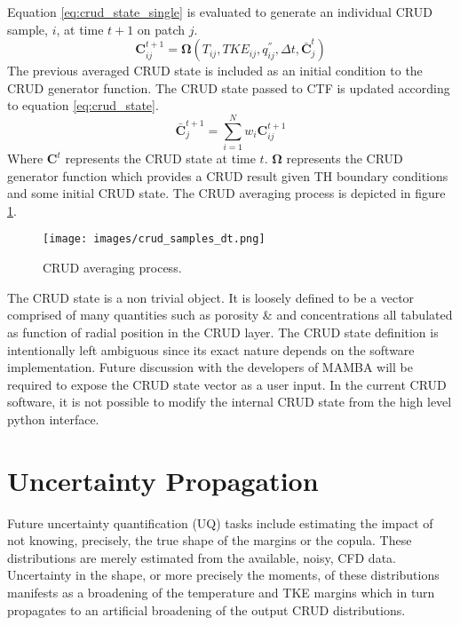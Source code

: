 Equation \ref{eq:crud_state_single} is evaluated to generate an individual CRUD sample, $i$, at time $t+1$ on patch $j$.
\begin{equation}
\mathrm{\mathbf{C}}_{ij}^{t+1} = \mathbf{\Omega}(T_{ij}, TKE_{ij}, q_{ij}^{''}, \Delta t, \mathbf{\bar C}_j^t)
\label{eq:crud_state_single}
\end{equation}
The previous averaged CRUD state is included as an initial condition to the CRUD generator function.  The CRUD state passed to CTF is updated according to equation \ref{eq:crud_state}.
\begin{equation}
\mathrm{\mathbf{\bar C}}_j^{t+1} = \sum_{i=1}^N w_i \mathrm{\mathbf{C}}_{ij}^{t+1}
\label{eq:crud_state}
\end{equation}
Where $\mathbf{C}^t$ represents the CRUD state at time $t$.  $\mathbf{\Omega}$ represents the CRUD generator function which provides a CRUD result given TH boundary conditions and some initial CRUD state.   
The CRUD averaging process is depicted in figure \ref{fig:crud_samples_dt}.

\begin{figure}[hbtp]
\centering
\texttt{[image: images/crud\_samples\_dt.png]}
\caption{CRUD averaging process.}
\label{fig:crud_samples_dt}
\end{figure}

The CRUD state is a non trivial object.  It is loosely defined to be a vector  comprised of many quantities such as porosity \&  and  concentrations all tabulated as function of radial position in the CRUD layer.  The CRUD state definition is intentionally left ambiguous since its exact nature depends on the software implementation.   Future discussion with the developers of MAMBA will be required to expose the CRUD state vector as a user input.  In the current CRUD software, it is not possible to modify the internal CRUD state from the high level python interface.

\section{Uncertainty Propagation}

Future uncertainty quantification (UQ) tasks include estimating the impact of not knowing, precisely, the true shape of the margins or the copula.  These distributions are merely estimated from the available, noisy, CFD data.  Uncertainty in the shape, or more precisely the moments, of these distributions manifests as a broadening of the temperature and TKE margins which in turn propagates to an artificial broadening of the output CRUD distributions.


